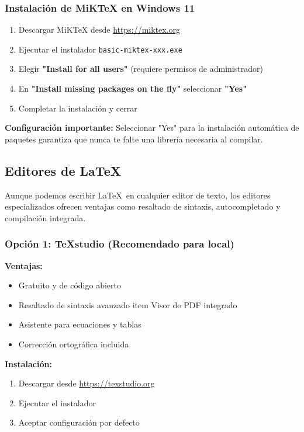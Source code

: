 \documentclass[11pt,letterpaper]{article}
\newcommand{\codigo}[1]{\texttt{\textcolor{codegray}{#1}}}
\begin{document}
	\subsubsection{Instalación de MiKTeX en Windows 11}
	
	\begin{enumerate}
		\item Descargar MiKTeX desde \url{https://miktex.org}
		\item Ejecutar el instalador \codigo{basic-miktex-xxx.exe}
		\item Elegir \textbf{"Install for all users"} (requiere permisos de administrador)
		\item En \textbf{"Install missing packages on the fly"} seleccionar \textbf{"Yes"}
		\item Completar la instalación y cerrar
	\end{enumerate}
	
	\begin{cajanota}
		\textbf{Configuración importante:} Seleccionar "Yes" para la instalación automática de paquetes garantiza que nunca te falte una librería necesaria al compilar.
	\end{cajanota}
	
	\subsection{Editores de \LaTeX}
	
	Aunque podemos escribir \LaTeX \ en cualquier editor de texto, los editores especializados ofrecen ventajas como resaltado de sintaxis, autocompletado y compilación integrada.
	
	\subsubsection{Opción 1: TeXstudio (Recomendado para local)}
	
	\textbf{Ventajas:}
	\begin{itemize}
		\item Gratuito y de código abierto
		\item Resaltado de sintaxis avanzado
		item Visor de PDF integrado
		\item Asistente para ecuaciones y tablas
		\item Corrección ortográfica incluida
	\end{itemize}
	
	\textbf{Instalación:}
	\begin{enumerate}
		\item Descargar desde \url{https://texstudio.org}
		\item Ejecutar el instalador
		\item Aceptar configuración por defecto
	\end{enumerate}
	
\end{document}
